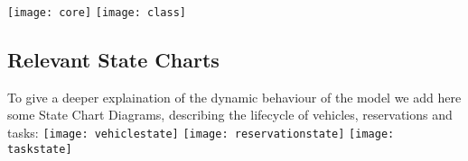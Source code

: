 \texttt{[image: core]}
\texttt{[image: class]}

\subsection{Relevant State Charts}
To give a deeper explaination of the dynamic behaviour of the model we add here some State Chart Diagrams, describing the lifecycle of vehicles, reservations and tasks:
\texttt{[image: vehiclestate]}
\texttt{[image: reservationstate]}
\texttt{[image: taskstate]}

